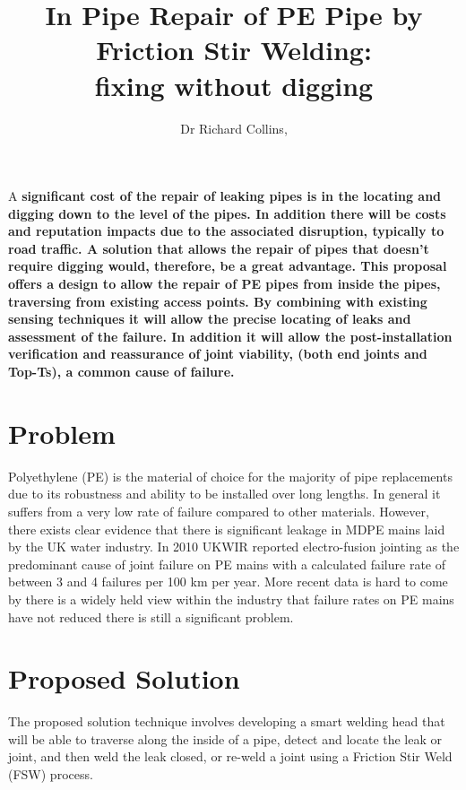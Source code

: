 \documentclass[	DIV=calc,%
							paper=a4,%
							fontsize=11pt,%
							twocolumn]{scrartcl}	 					%
\title{In Pipe Repair of PE Pipe by Friction Stir Welding:\\
\huge{fixing without digging}}
\author{Dr Richard Collins, }											%
\date{}																				%
\newcommand{\initial}[1]{%
     \lettrine[lines=3,lhang=0.3,nindent=0em]{
     				\color{Black}
     				{\textsf{#1}}}{}}
\begin{document}
\maketitle
\thispagestyle{fancy} 			%

\initial{A} \textbf{significant cost of the repair of leaking pipes is in the locating and digging down to the level of the pipes.  
In addition there will be costs and reputation impacts due to the associated 
disruption, typically to road traffic.
A solution that allows the repair of pipes that doesn't require 
digging would, therefore, be a great advantage.  This proposal offers a design 
to allow the repair of PE pipes from inside the pipes, traversing from existing 
access points. By combining with existing sensing techniques it will allow the 
precise locating of leaks and assessment of the failure. In addition it will 
allow the post-installation verification and reassurance of joint viability, 
(both end joints and Top-Ts), a common cause of failure.}





\section*{Problem}
Polyethylene (PE) is the material of choice for the majority of pipe 
replacements due to its robustness and ability to be installed over long 
lengths. 
In general it suffers from a very low rate of failure compared to other materials. 
However, there exists clear evidence that there is significant leakage in MDPE 
mains laid by the UK water industry.
In 2010 UKWIR \cite{UKWIR2010} reported electro-fusion jointing as the predominant cause of joint failure on PE mains with a calculated failure rate of between 3 and 4 failures per 100 km per year. 
More recent data is hard to come by there is a widely held view within the industry that failure rates on PE mains have not reduced there is still a significant problem.



\section*{Proposed Solution}
The proposed solution technique involves developing a smart welding head that 
will be able to traverse along the inside of a pipe, detect and locate the leak 
or joint, and then weld the leak closed, or re-weld a joint using a Friction 
Stir Weld (FSW) process.
\end{document}

